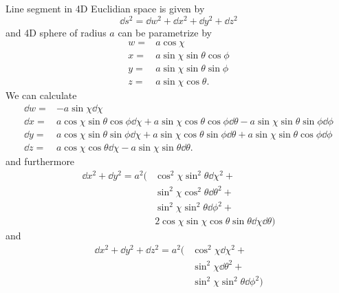 Line segment in 4D Euclidian space is given by
%
\begin{equation}
    \dd s^2 = \dd w^2 + \dd x^2 + \dd y^2 + \dd z^2
\end{equation}
%
and 4D sphere of radius $a$ can be parametrize by
%
\begin{subequations}
    \begin{align}
        w = & a \cos \chi                       \\
        x = & a \sin \chi \sin \theta \cos \phi \\
        y = & a \sin \chi \sin \theta \sin \phi \\
        z = & a \sin \chi \cos \theta.
    \end{align}
\end{subequations}
%
We can calculate
%
\begin{subequations}
    \begin{align}
        \dd w = & - a \sin \chi \dd \chi                       \\
        \dd x = & a \cos \chi \sin \theta \cos \phi \dd \chi +
        a \sin \chi \cos \theta \cos \phi \dd \theta -
        a \sin \chi \sin \theta \sin \phi \dd \phi             \\
        \dd y = & a \cos \chi \sin \theta \sin \phi \dd \chi +
        a \sin \chi \cos \theta \sin \phi \dd \theta +
        a \sin \chi \sin \theta \cos \phi \dd \phi             \\
        \dd z = & a \cos \chi \cos \theta \dd \chi -
        a \sin \chi \sin \theta \dd \theta.
    \end{align}
\end{subequations}
%
and furthermore
%
\begin{align*}
    \dd x^2 + \dd y^2 = a^2( & \cos^2 \chi \sin^2 \theta \dd \chi^2 +                             \\
                             & \sin^2 \chi \cos^2 \theta \dd \theta^2 +                           \\
                             & \sin^2 \chi \sin^2 \theta \dd \phi^2 +                             \\
                             & 2\cos \chi \sin \chi \cos \theta \sin \theta \dd \chi \dd \theta )
\end{align*}
%
and
%
\begin{align*}
    \dd x^2 + \dd y^2 + \dd z^2 = a^2( & \cos^2 \chi \dd \chi^2 +              \\
                                       & \sin^2 \chi \dd \theta^2 +            \\
                                       & \sin^2 \chi \sin^2 \theta \dd \phi^2)
\end{align*}
